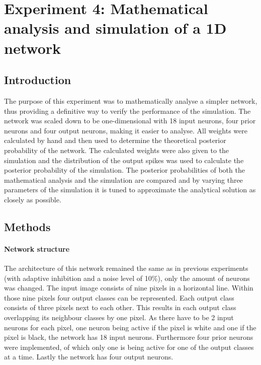 \section{Experiment 4: Mathematical analysis and simulation of a 1D network}
\label{section:1D}

\subsection{Introduction}

The purpose of this experiment was to mathematically analyse a simpler network, thus providing a definitive way to verify the performance of the simulation. The network was scaled down to be one-dimensional with 18 input neurons, four prior neurons and four output neurons, making it easier to analyse. All weights were calculated by hand and then used to determine the theoretical posterior probability of the network. The calculated weights were also given to the simulation and the distribution of the output spikes was used to calculate the posterior probability of the simulation. The posterior probabilities of both the mathematical analysis and the simulation are compared and by varying three parameters of the simulation it is tuned to approximate the analytical solution as closely as possible.

\subsection{Methods}

\paragraph{Network structure}
The architecture of this network remained the same as in previous experiments (with adaptive inhibition and a noise level of 10\%), only the amount of neurons was changed. The input image consists of nine pixels in a horizontal line. Within those nine pixels four output classes can be represented. Each output class consists of three pixels next to each other. This results in each output class overlapping its neighbour classes by one pixel. As there have to be 2 input neurons for each pixel, one neuron being active if the pixel is white and one if the pixel is black, the network has 18 input neurons. Furthermore four prior neurons were implemented, of which only one is being active for one of the output classes at a time. Lastly the network has four output neurons.

